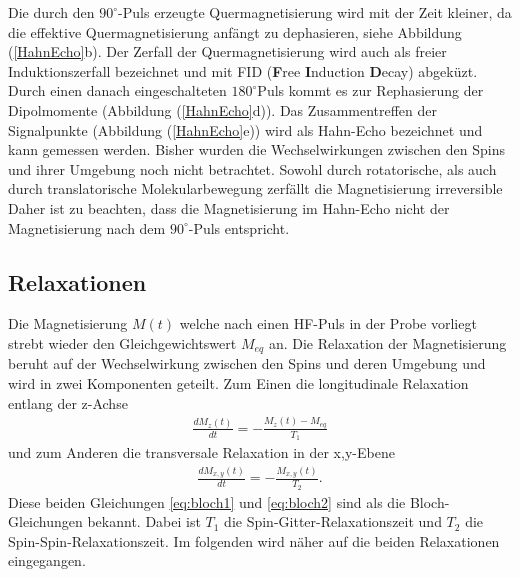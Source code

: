 Die durch den $90^{\circ}$-Puls erzeugte Quermagnetisierung wird mit der Zeit kleiner, da die effektive Quermagnetisierung anf\"{a}ngt zu dephasieren, siehe Abbildung (\ref{HahnEcho}b).
Der Zerfall der Quermagnetisierung wird auch als freier Induktionszerfall bezeichnet und mit FID (\textbf{F}ree \textbf{I}nduction \textbf{D}ecay) abgek\"{u}zt.
Durch einen danach eingeschalteten $180^{\circ}${\-}Puls kommt es zur Rephasierung der Dipol{\-}mo{\-}men{\-}te (Abbildung (\ref{HahnEcho}d)).
Das Zusam{\-}men{\-}tref{\-}fen der Signalpunkte (Abbildung (\ref{HahnEcho}e)) wird als Hahn-Echo bezeichnet und kann gemessen werden.
Bisher wurden die Wechselwirkungen zwischen den Spins und ihrer Umgebung noch nicht betrachtet.
Sowohl durch rotatorische, als auch durch translatorische Molekularbewegung zerf\"{a}llt die Magnetisierung irreversible
Daher ist zu beachten, dass die Magnetisierung im Hahn-Echo nicht der Magnetisierung nach dem $90^{\circ}$-Puls entspricht.


\subsection{Relaxationen}
Die Magnetisierung $M(t)$ welche nach einen HF-Puls in der Probe vorliegt strebt wieder den Gleichgewichtswert $M_{eq}$ an.
Die Relaxation der Magnetisierung beruht auf der Wechselwirkung zwischen den Spins und deren Umgebung und wird in zwei Komponenten geteilt.
Zum Einen die longitudinale Relaxation entlang der z-Achse
\begin{align}
	\frac{d M_z(t)}{d t} = - \frac{M_z(t) - M_{eq}}{T_1} 
	\label{eq:bloch1}
\end{align}
und zum Anderen die transversale Relaxation in der x,y-Ebene
\begin{align}
	\frac{d M_{x,y}(t)}{d t} = - \frac{M_{x,y}(t)}{T_2}. 
	\label{eq:bloch2}
\end{align}
Diese beiden Gleichungen \eqref{eq:bloch1} und \eqref{eq:bloch2} sind als die Bloch-Gleichungen bekannt.
Dabei ist $T_1$ die Spin-Gitter-Relaxationszeit und $T_2$ die Spin-Spin-Relaxationszeit.
Im folgenden wird n\"{a}her auf die beiden Relaxationen eingegangen.

